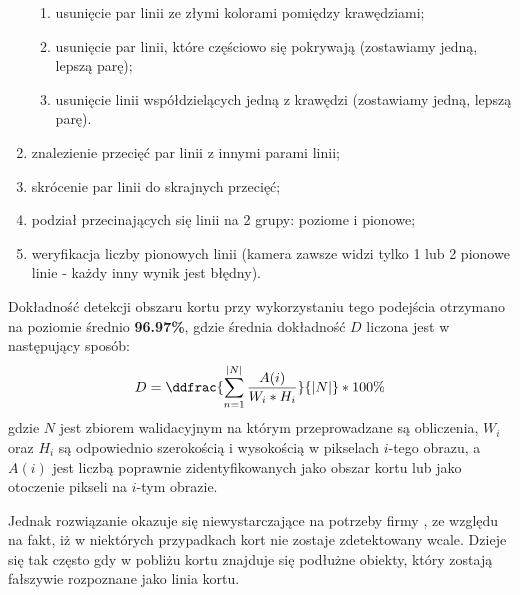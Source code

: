 \begin{enumerate}
\begin{enumerate}
          \item usunięcie par linii ze złymi kolorami pomiędzy krawędziami;
          \item usunięcie par linii, które częściowo się pokrywają (zostawiamy jedną, lepszą parę);
          \item usunięcie linii współdzielących jedną z krawędzi (zostawiamy jedną, lepszą parę).
        \end{enumerate}
  \item znalezienie przecięć par linii z innymi parami linii;
  \item skrócenie par linii do skrajnych przecięć;
  \item podział przecinających się linii na 2 grupy: poziome i pionowe;
  \item weryfikacja liczby pionowych linii (kamera zawsze widzi tylko 1 lub 2 pionowe linie - każdy inny wynik jest błędny).
\end{enumerate}

Dokładność detekcji obszaru kortu przy wykorzystaniu tego podejścia otrzymano na poziomie średnio \textbf{96.97\%}, gdzie średnia dokładność $D$ liczona jest w następujący sposób:
\vspace{-3pt} 
\[
\vspace{-3pt}
D = \ddfrac{\sum_{n = 1}^{|N|} \frac{A(i)}{W_{i} * H_{i}}}{|N|} * 100\%
\vspace{-3pt}
\]
gdzie $N$ jest zbiorem walidacyjnym na którym przeprowadzane są obliczenia, $W_{i}$ oraz $H_{i}$ są odpowiednio szerokością i wysokością w pikselach $i$-tego obrazu, a $A(i)$ jest liczbą poprawnie zidentyfikowanych jako obszar kortu lub jako otoczenie pikseli na $i$-tym obrazie.

Jednak rozwiązanie okazuje się niewystarczające na potrzeby firmy \blue{}, ze względu na fakt, iż w niektórych przypadkach kort nie zostaje zdetektowany wcale. Dzieje się tak często gdy w pobliżu kortu znajduje się podłużne obiekty, który zostają fałszywie rozpoznane jako linia kortu.

